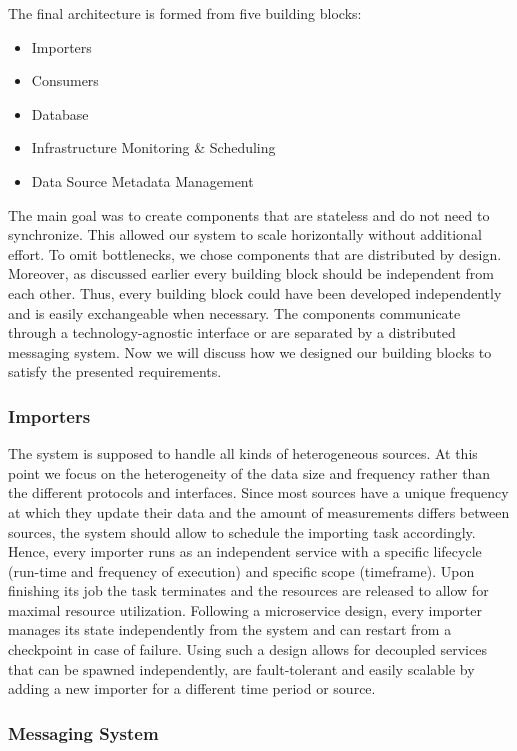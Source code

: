 The final architecture is formed from five building blocks:

\begin{itemize}
\tightlist
\item
  Importers
\item
  Consumers
\item
  Database
\item
  Infrastructure Monitoring \& Scheduling
\item
  Data Source Metadata Management
\end{itemize}

The main goal was to create components that are stateless and do not
need to synchronize. This allowed our system to scale horizontally
without additional effort. To omit bottlenecks, we chose components that
are distributed by design. Moreover, as discussed earlier every building
block should be independent from each other. Thus, every building block
could have been developed independently and is easily exchangeable when
necessary. The components communicate through a technology-agnostic
interface or are separated by a distributed messaging system. Now we
will discuss how we designed our building blocks to satisfy the
presented requirements.

\subsubsection{Importers}\label{importers}

The system is supposed to handle all kinds of heterogeneous sources. At
this point we focus on the heterogeneity of the data size and frequency
rather than the different protocols and interfaces. Since most sources
have a unique frequency at which they update their data and the amount
of measurements differs between sources, the system should allow to
schedule the importing task accordingly. Hence, every importer runs as
an independent service with a specific lifecycle (run-time and frequency
of execution) and specific scope (timeframe). Upon finishing its job the
task terminates and the resources are released to allow for maximal
resource utilization. Following a microservice design, every importer
manages its state independently from the system and can restart from a
checkpoint in case of failure. Using such a design allows for decoupled
services that can be spawned independently, are fault-tolerant and
easily scalable by adding a new importer for a different time period or
source.

\subsubsection{Messaging System}\label{messaging-system}

